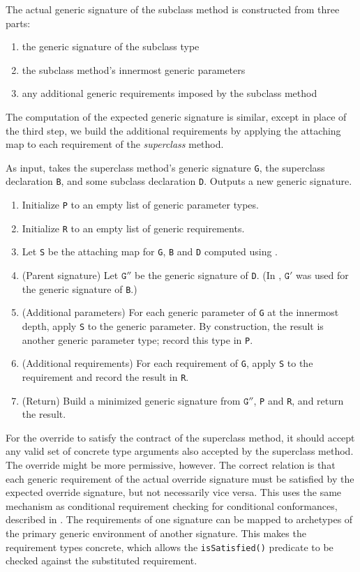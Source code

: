 \documentclass[../generics]{subfiles}
\begin{document}
The actual generic signature of the subclass method is constructed from three parts:
\begin{enumerate}
\item the generic signature of the subclass type
\item the subclass method's innermost generic parameters
\item any additional generic requirements imposed by the subclass method
\end{enumerate}
The computation of the expected generic signature is similar, except in place of the third step, we build the additional requirements by applying the attaching map to each requirement of the \emph{superclass} method.
\begin{algorithm} As input, takes the superclass method's generic signature \texttt{G}, the superclass declaration \texttt{B}, and some subclass declaration \texttt{D}. Outputs a new generic signature.
\begin{enumerate}
\item Initialize \texttt{P} to an empty list of generic parameter types.
\item Initialize \texttt{R} to an empty list of generic requirements.
\item Let \texttt{S} be the attaching map for \texttt{G}, \texttt{B} and \texttt{D} computed using .
\item (Parent signature) Let $\texttt{G}''$ be the generic signature of \texttt{D}. (In , $\texttt{G}'$ was used for the generic signature of \texttt{B}.)
\item (Additional parameters) For each generic parameter of \texttt{G} at the innermost depth, apply \texttt{S} to the generic parameter. By construction, the result is another generic parameter type; record this type in \texttt{P}.
\item (Additional requirements) For each requirement of \texttt{G}, apply \texttt{S} to the requirement and record the result in \texttt{R}.
\item (Return) Build a minimized generic signature from $\texttt{G}''$, \texttt{P} and \texttt{R}, and return the result.
\end{enumerate}
\end{algorithm}

For the override to satisfy the contract of the superclass method, it should accept any valid set of concrete type arguments also accepted by the superclass method. The override might be more permissive, however. The correct relation is that each generic requirement of the actual override signature must be satisfied by the expected override signature, but not necessarily vice versa. This uses the same mechanism as conditional requirement checking for conditional conformances, described in . The requirements of one signature can be mapped to archetypes of the primary generic environment of another signature. This makes the requirement types concrete, which allows the \texttt{isSatisfied()} predicate to be checked against the substituted requirement.
\end{document}
